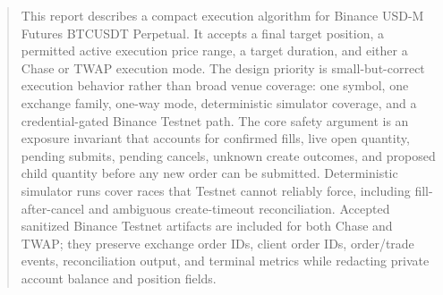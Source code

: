 \begin{abstract}
This report describes a compact execution algorithm for Binance USD-M Futures BTCUSDT Perpetual. It accepts a final target position, a permitted active execution price range, a target duration, and either a Chase or TWAP execution mode. The design priority is small-but-correct execution behavior rather than broad venue coverage: one symbol, one exchange family, one-way mode, deterministic simulator coverage, and a credential-gated Binance Testnet path. The core safety argument is an exposure invariant that accounts for confirmed fills, live open quantity, pending submits, pending cancels, unknown create outcomes, and proposed child quantity before any new order can be submitted. Deterministic simulator runs cover races that Testnet cannot reliably force, including fill-after-cancel and ambiguous create-timeout reconciliation. Accepted sanitized Binance Testnet artifacts are included for both Chase and TWAP; they preserve exchange order IDs, client order IDs, order/trade events, reconciliation output, and terminal metrics while redacting private account balance and position fields.
\end{abstract}
